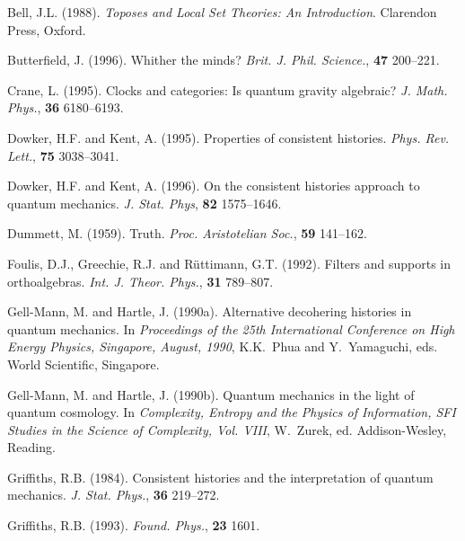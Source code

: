 \documentclass[12pt]{article}
\begin{document}
\begin{trivlist}

\item[] Bell, J.L. (1988).
  {\em Toposes and Local Set Theories: {A}n Introduction}.
  Clarendon Press, Oxford.

\item[] Butterfield, J. (1996). Whither the minds?
  {\em Brit. J. Phil. Science.}, {\bf 47} 200--221.

\item[] Crane, L. (1995).
  Clocks and categories: {I}s quantum gravity algebraic?
  {\em J. Math. Phys.}, {\bf 36 } 6180--6193.

\item[] Dowker, H.F. and Kent, A. (1995).
  Properties of consistent histories.
  {\em Phys. Rev. Lett.}, {\bf 75} 3038--3041.

\item[] Dowker, H.F. and Kent, A. (1996).
  On the consistent histories approach to quantum mechanics.
  {\em J. Stat. Phys}, {\bf 82} 1575--1646.

\item[] Dummett, M. (1959).
  Truth. {\em Proc. Aristotelian Soc.}, {\bf 59} 141--162.

\item[] Foulis, D.J., Greechie, R.J. and R\"uttimann, G.T. (1992).
  Filters and supports in orthoalgebras.
  {\em Int. J. Theor. Phys.}, {\bf 31} 789--807.

\item[] Gell-Mann, M. and Hartle, J. (1990a).
  Alternative decohering histories in quantum mechanics.
  In {\em Proceedings of the 25th International Conference
  on High Energy Physics, Singapore, August, 1990}, K.K.~Phua and
  Y.~Yamaguchi, eds. World Scientific, Singapore.

\item[] Gell-Mann, M. and Hartle, J. (1990b).
  Quantum mechanics in the light of quantum cosmology.
  In  {\em Complexity, Entropy and the Physics of
  Information, SFI Studies in the Science of Complexity, {Vol.
  VIII}}, W.~Zurek, ed. Addison-Wesley, Reading.

\item[] Griffiths, R.B. (1984).
  Consistent histories and the interpretation of quantum mechanics.
  {\em J. Stat. Phys.}, {\bf 36} 219--272.

\item[] Griffiths, R.B. (1993).
  {\em Found. Phys.}, {\bf 23} 1601.


\end{trivlist}
\end{document}
